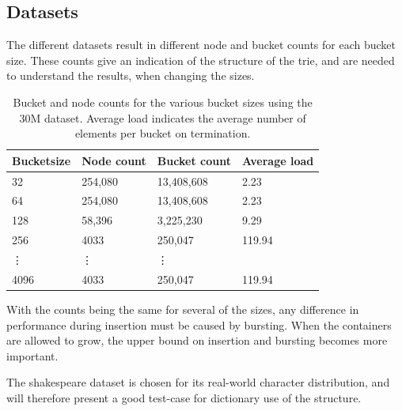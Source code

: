 \subsection{Datasets}
The different datasets result in different node and bucket counts for each
bucket size. These counts give an indication of the structure of the trie,
and are needed to understand the results, when changing the sizes.

\begin{table}[h]
    \centering
    \begin{tabular}[here]{ l l l l }
        \hline
        Bucketsize& Node count  & Bucket count & Average load  \\\hline
        32        &  254,080    & 13,408,608   & 2.23\\
        64        &  254,080    & 13,408,608   & 2.23\\
        128       &  58,396     & 3,225,230    & 9.29\\
        256       &  4033       & 250,047      & 119.94\\
        \vdots    &  \vdots     & \vdots       &\\
        4096      &  4033       & 250,047      & 119.94\\\hline 
    \end{tabular}
    \caption{Bucket and node counts for the various bucket sizes using the
        30M dataset. Average load indicates the average number of elements
        per bucket on termination.}
    \label{tab:bncounts_30M}
\end{table}

With the counts being the same for several of the sizes, any difference in performance
during insertion must be caused by bursting. When the containers are allowed to grow,
the upper bound on insertion and bursting becomes more important.

The shakespeare dataset is chosen for its real-world character distribution, and will
therefore present a good test-case for dictionary use of the structure.


